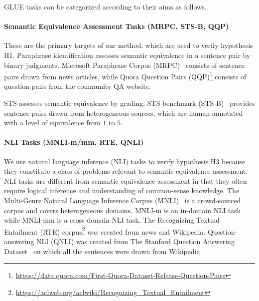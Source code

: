 \documentclass[11pt,a4paper]{article}
\begin{document}
GLUE tasks can be categorized according to their aims as follows. 


\paragraph{Semantic Equivalence Assessment Tasks (MRPC, STS-B, QQP)}
These are the primary targets of our method, which are used to verify hypothesis H1. 
Paraphrase identification assesses semantic equivalence in a sentence pair by binary judgments. 
Microsoft Paraphrase Corpus (MRPC)~\cite{dolan-quirk-brockett:2004:COLING} consists of sentence pairs drawn from news articles, while Quora Question Pairs (QQP)\footnote{\url{https://data.quora.com/First-Quora-Dataset-Release-Question-Pairs}} consists of question pairs from the community QA website. 


STS assesses semantic equivalence by grading. 
STS benchmark (STS-B)~\cite{cer-etal-2017-semeval} provides sentence pairs drawn from heterogeneous sources, which are human-annotated with a level of equivalence from $1$ to $5$.   

\paragraph{NLI Tasks (MNLI-m/mm, RTE, QNLI)}
We use natural language inference (NLI) tasks to verify hypothesis H3 because they constitute a class of problems relevant to semantic equivalence assessment. 
NLI tasks are different from semantic equivalence assessment in that they often require logical inference and understanding of common-sense knowledge.  
The Multi-Genre Natural Language Inference Corpus (MNLI)~\cite{williams-etal-2018-broad} is a crowd-sourced corpus and covers heterogeneous domains. 
MNLI-m is an in-domain NLI task while MNLI-mm is a cross-domain NLI task. 
The Recognizing Textual Entailment (RTE) corpus\footnote{\url{https://aclweb.org/aclwiki/Recognizing_Textual_Entailment}} was created from news and Wikipedia. 
Question-answering NLI (QNLI) was created from The Stanford Question Answering Dataset~\cite{rajpurkar-etal-2016-squad} on which all the sentences were drawn from Wikipedia. 


\end{document}
